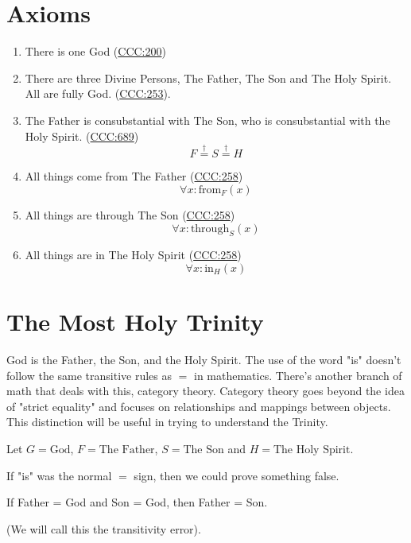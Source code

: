 \documentclass[11pt]{article}
\begin{document}
\section{Axioms}
\label{sec:axioms}

\begin{enumerate}
\item There is one God (\href{https://www.vatican.va/archive/ENG0015/__P16.HTM}{CCC:200})
\item There are three Divine Persons, The Father, The Son and The Holy Spirit. All are fully God. (\href{https://www.vatican.va/archive/ENG0015/__P17.HTM}{CCC:253}).
\item The Father is consubstantial with The Son, who is consubstantial with the Holy Spirit. (\href{https://www.vatican.va/archive/ENG0015/__P20.HTM}{CCC:689})
   $$F \stackrel{\dagger}{=} S \stackrel{\dagger}{=} H$$
\item All things come from The Father (\href{https://www.vatican.va/archive/ENG0015/__P17.HTM}{CCC:258})
   $$\forall x : \text{from}_F(x)$$
\item All things are through The Son (\href{https://www.vatican.va/archive/ENG0015/__P17.HTM}{CCC:258})
   $$\forall x : \text{through}_S(x)$$
\item All things are in The Holy Spirit (\href{https://www.vatican.va/archive/ENG0015/__P17.HTM}{CCC:258})
   $$\forall x : \text{in}_H(x)$$
\end{enumerate}

\section{The Most Holy Trinity}
\label{sec:trinity}

God is the Father, the Son, and the Holy Spirit. The use of the word "is" doesn't follow the same transitive rules as $=$ in mathematics. There's another branch of math that deals with this, category theory. Category theory goes beyond the idea of "strict equality" and focuses on relationships and mappings between objects. This distinction will be useful in trying to understand the Trinity.

Let $G = \text{God}$, $F = \text{The Father}$, $S = \text{The Son}$ and $H = \text{The Holy Spirit}$.

If "is" was the normal $=$ sign, then we could prove something false.

\begin{tcolorbox}[colback=gray!20, colframe=gray!50, title=False reasoning we will avoid when we make the definition of "is" precise:]
If Father = God and Son = God, then Father = Son.

(We will call this the transitivity error).
\end{tcolorbox}
\end{document}
